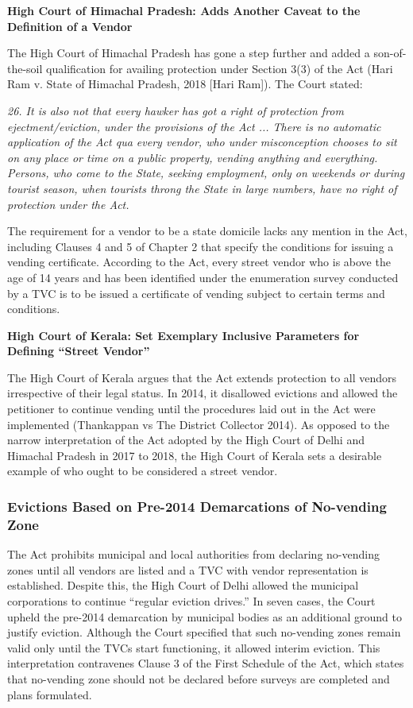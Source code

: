 \documentclass[a4paper, 12pt, twoside]{article}
\begin{document}
\textbf{High Court of Himachal Pradesh: Adds Another Caveat to the Definition of a Vendor}

The High Court of Himachal Pradesh has gone a step further and added a son-of-the-soil qualification for availing protection under Section 3(3) of the Act (Hari Ram v. State of Himachal Pradesh, 2018 [Hari Ram]). The Court stated: 

\textit{26. It is also not that every hawker has got a right of protection from ejectment/eviction, under the provisions of the Act ... There is no automatic application of the Act qua every vendor, who under misconception chooses to sit on any place or time on a public property, vending anything and everything. Persons, who come to the State, seeking employment, only on weekends or during tourist season, when tourists throng the State in large numbers, have no right of protection under the Act.}

The requirement for a vendor to be a state domicile lacks any mention in the Act, including Clauses 4 and 5 of Chapter 2 that specify the conditions for issuing a vending certificate. According to the Act, every street vendor who is above the age of 14 years and has been identified under the enumeration survey conducted by a TVC is to be issued a certificate of vending subject to certain terms and conditions. 

\textbf{High Court of Kerala: Set Exemplary Inclusive Parameters for Defining “Street Vendor”}

The High Court of Kerala argues that the Act extends protection to all vendors irrespective of their legal status. In 2014, it disallowed evictions and allowed the petitioner to continue vending until the procedures laid out in the Act were implemented (Thankappan vs The District Collector 2014). As opposed to the narrow interpretation of the Act adopted by the High Court of Delhi and Himachal Pradesh in 2017 to 2018, the High Court of Kerala sets a desirable example of who ought to be considered a street vendor.

\subsubsection{Evictions Based on Pre-2014 Demarcations of No-vending Zone}

The Act prohibits municipal and local authorities from declaring no-vending zones until all vendors are listed and a TVC with vendor representation is established. Despite this, the High Court of Delhi allowed the municipal corporations to continue “regular eviction drives.” In seven cases, the Court upheld the pre-2014 demarcation by municipal bodies as an additional ground to justify eviction.  Although the Court specified that such no-vending zones remain valid only until the TVCs start functioning, it allowed interim eviction. This interpretation contravenes Clause 3 of the First Schedule of the Act, which states that no-vending zone should not be declared before surveys are completed and plans formulated.
\end{document}
